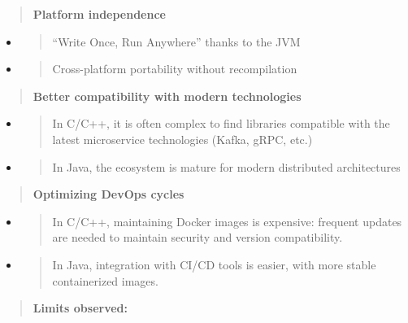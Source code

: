\documentclass[12pt,a4paper]{report}
\begin{document}
\begin{quote}
\textbf{Platform independence}
\end{quote}

\begin{itemize}
\item
  \begin{quote}
  ``Write Once, Run Anywhere'' thanks to the JVM
  \end{quote}
\item
  \begin{quote}
  Cross-platform portability without recompilation
  \end{quote}
\end{itemize}

\begin{quote}
\textbf{Better compatibility with modern technologies}
\end{quote}

\begin{itemize}
\item
  \begin{quote}
  In C/C++, it is often complex to find libraries compatible with the
  latest microservice technologies (Kafka, gRPC, etc.)
  \end{quote}
\item
  \begin{quote}
  In Java, the ecosystem is mature for modern distributed architectures
  \end{quote}
\end{itemize}

\begin{quote}
\textbf{Optimizing DevOps cycles}
\end{quote}

\begin{itemize}
\item
  \begin{quote}
  In C/C++, maintaining Docker images is expensive: frequent updates are
  needed to maintain security and version compatibility.
  \end{quote}
\item
  \begin{quote}
  In Java, integration with CI/CD tools is easier, with more stable
  containerized images.
  \end{quote}
\end{itemize}

\begin{quote}
\textbf{Limits observed:}
\end{quote}
\end{document}
